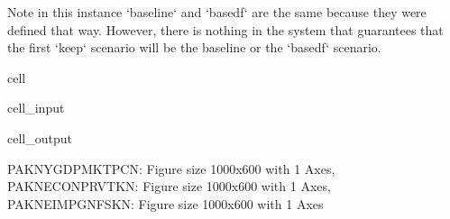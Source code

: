 \documentclass[letterpaper,10pt,english]{jupyterBook}
\begin{document}
\begin{sphinxVerbatim}[commandchars=\\\{\}]
Note in this instance `baseline` and `basedf` are the same because they were defined that way.  However, there is nothing in the system that guarantees that the first `keep` scenario will be the baseline or the `basedf` scenario.
\end{sphinxVerbatim}

\begin{sphinxuseclass}{cell}\begin{sphinxVerbatimInput}

\begin{sphinxuseclass}{cell_input}
\begin{sphinxVerbatim}[commandchars=\\\{\}]
  
\end{sphinxVerbatim}

\end{sphinxuseclass}\end{sphinxVerbatimInput}
\begin{sphinxVerbatimOutput}

\begin{sphinxuseclass}{cell_output}
\noindent{}

\noindent{}

\noindent{}

\begin{sphinxVerbatim}[commandchars=\\\{\}]
\PYGZob{}\PYGZsq{}PAKNYGDPMKTPCN\PYGZsq{}: \PYGZlt{}Figure size 1000x600 with 1 Axes\PYGZgt{},
 \PYGZsq{}PAKNECONPRVTKN\PYGZsq{}: \PYGZlt{}Figure size 1000x600 with 1 Axes\PYGZgt{},
 \PYGZsq{}PAKNEIMPGNFSKN\PYGZsq{}: \PYGZlt{}Figure size 1000x600 with 1 Axes\PYGZgt{}\PYGZcb{}
\end{sphinxVerbatim}

\end{sphinxuseclass}\end{sphinxVerbatimOutput}

\end{sphinxuseclass}
\end{document}
